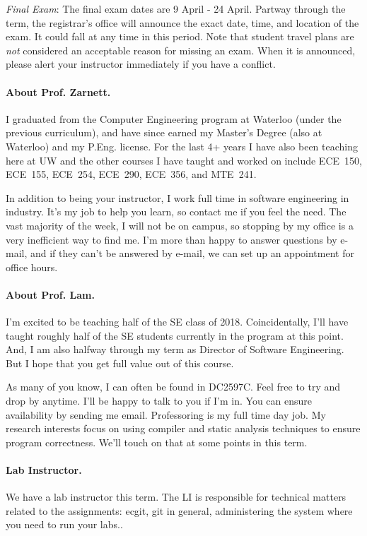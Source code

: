 \documentclass[letterpaper,10pt]{article}
\begin{document}
\textit{Final Exam}: The final exam dates are 9 April - 24 April. Partway through the term, the registrar's office will announce the exact date, time, and location of the exam. It could fall at any time in this period. Note that student travel plans are \emph{not} considered an acceptable reason for missing an exam. When it is announced, please alert your instructor immediately if you have a conflict.

\paragraph{About Prof. Zarnett.}
I graduated from the Computer Engineering program at Waterloo (under the previous curriculum), and have since earned my Master's Degree (also at Waterloo) and my P.Eng. license. For the last 4+ years I have also been teaching here at UW and the other courses I have taught and worked on include ECE~150, ECE~155, ECE~254, ECE~290, ECE~356, and MTE~241.

In addition to being your instructor, I work full time in software engineering in industry. It's my job to help you learn, so contact me if you feel the need. The vast majority of the week, I will not be on campus, so stopping by my office is a very inefficient way to find me. I'm more than happy to answer questions by e-mail, and if they can't be answered by e-mail, we can set up an appointment for office hours.

\paragraph{About Prof. Lam.} I'm excited to be teaching half of the SE class of 2018. Coincidentally, I'll have taught roughly half of the SE students currently in the program at this point. And, I am also halfway through my term as Director of Software Engineering. But I hope that you get full value out of this course.

As many of you know, I can often be found in DC2597C. Feel free to try and drop by anytime. I'll be happy to talk to you if I'm in. You can ensure availability by sending me email. Professoring is my full time day job. My research interests focus on using compiler and static analysis techniques to ensure program correctness. We'll touch on that at some points in this term.

\paragraph{Lab Instructor.}
We have a lab instructor this term. The LI is responsible for technical matters related to the assignments: ecgit, git in general, administering the system where you need to run your labs..
\end{document}
